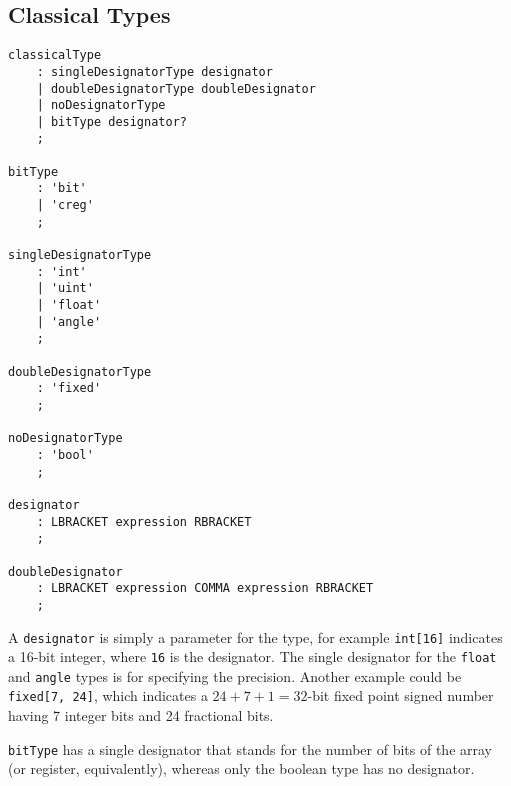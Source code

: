 \documentclass[12pt,a4paper]{report}
\theoremstyle{definition}
\theoremstyle{definition}
\theoremstyle{definition}
\begin{document}
\pagebreak

\subsection{Classical Types}
\begin{lstlisting}
classicalType
    : singleDesignatorType designator
    | doubleDesignatorType doubleDesignator
    | noDesignatorType
    | bitType designator?
    ;

bitType
    : 'bit'
    | 'creg'
    ;

singleDesignatorType
    : 'int'
    | 'uint'
    | 'float'
    | 'angle'
    ;

doubleDesignatorType
    : 'fixed'
    ;

noDesignatorType
    : 'bool'
    ;

designator
    : LBRACKET expression RBRACKET
    ;

doubleDesignator
    : LBRACKET expression COMMA expression RBRACKET
    ;
\end{lstlisting}
A \texttt{designator} is simply a parameter for the type, for example \texttt{int[16]} indicates a 16-bit integer, where \texttt{16} is the designator. The single designator for the \texttt{float} and \texttt{angle} types is for specifying the precision. Another example could be \texttt{fixed[7, 24]}, which indicates a $24+7+1=32$-bit fixed point signed number having 7 integer bits and 24 fractional bits.

\texttt{bitType} has a single designator that stands for the number of bits of the  array (or register, equivalently), whereas only the boolean type has no designator.
\end{document}
